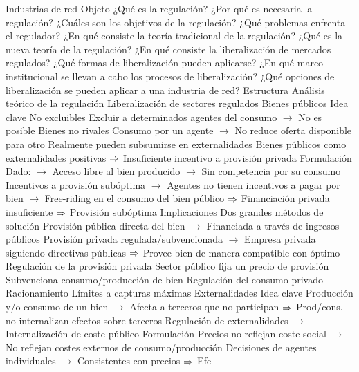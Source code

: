 \documentclass{nuevotema}
\begin{document}
\begin{esquemal}
				\4[] Industrias de red
		\2 Objeto
			\3 ¿Qué es la regulación?
			\3 ¿Por qué es necesaria la regulación?
			\3 ¿Cuáles son los objetivos de la regulación?
			\3 ¿Qué problemas enfrenta el regulador?
			\3 ¿En qué consiste la teoría tradicional de la regulación?
			\3 ¿Qué es la nueva teoría de la regulación?
			\3 ¿En qué consiste la liberalización de mercados regulados?
			\3 ¿Qué formas de liberalización pueden aplicarse?
			\3 ¿En qué marco institucional se llevan a cabo los procesos de liberalización?
			\3 ¿Qué opciones de liberalización se pueden aplicar a una industria de red?
		\2 Estructura
			\3 Análisis teórico de la regulación
			\3 Liberalización de sectores regulados
	\1 
		\2 Bienes públicos
			\3 Idea clave
				\4 No excluibles
				\4[] Excluir a determinados agentes del consumo
				\4[] $\to$ No es posible
				\4 Bienes no rivales
				\4[] Consumo por un agente 
				\4[] $\to$ No reduce oferta disponible para otro
				\4 Realmente pueden subsumirse en externalidades
				\4[] Bienes públicos como externalidades positivas
				\4[] $\Rightarrow$ Insuficiente incentivo a provisión privada
			\3 Formulación
				\4 Dado:
				\4[] $\to$ Acceso libre al bien producido
				\4[] $\to$ Sin competencia por su consumo
				\4 Incentivos a provisión subóptima
				\4[] $\to$ Agentes no tienen incentivos a pagar por bien
				\4[] $\to$ Free-riding en el consumo del bien público
				\4[] $\Rightarrow$ Financiación privada insuficiente
				\4[] $\Rightarrow$ Provisión subóptima
			\3 Implicaciones
				\4 Dos grandes métodos de solución
				\4[] Provisión pública directa del bien
				\4[] $\to$ Financiada a través de ingresos públicos
				\4[] Provisión privada regulada/subvencionada
				\4[] $\to$ Empresa privada siguiendo directivas públicas
				\4[] $\Rightarrow$ Provee bien de manera compatible con óptimo
				\4 Regulación de la provisión privada
				\4[] Sector público fija un precio de provisión
				\4[] Subvenciona consumo/producción de bien
				\4 Regulación del consumo privado
				\4[] Racionamiento
				\4[] Límites a capturas máximas
		\2 Externalidades
			\3 Idea clave
				\4 Producción y/o consumo de un bien
				\4[] $\to$ Afecta a terceros que no participan
				\4[] $\Rightarrow$ Prod/cons. no internalizan efectos sobre terceros
				\4 Regulación de externalidades
				\4[] $\to$ Internalización de coste público
			\3 Formulación
				\4 Precios no reflejan coste social 
				\4[] $\to$ No reflejan costes externos de consumo/producción
				\4 Decisiones de agentes individuales
				\4[] $\to$ Consistentes con precios
				\4[] $\Rightarrow$ Efe

\end{esquemal}
\end{document}
